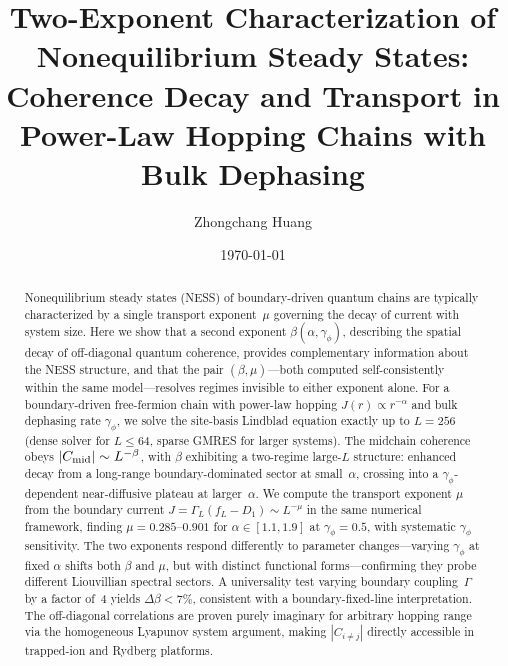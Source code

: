 \documentclass[aps,prb,twocolumn,superscriptaddress,floatfix]{revtex4-2}
\begin{document}
\title{Two-Exponent Characterization of Nonequilibrium Steady States: \\
Coherence Decay and Transport in Power-Law Hopping Chains with Bulk Dephasing}

\author{Zhongchang Huang}

\date{\today}

\begin{abstract}
Nonequilibrium steady states (NESS) of boundary-driven quantum chains are typically characterized by a single transport exponent~$\mu$ governing the decay of current with system size. Here we show that a second exponent $\beta(\alpha,\gamma_\phi)$, describing the spatial decay of off-diagonal quantum coherence, provides complementary information about the NESS structure, and that the pair $(\beta, \mu)$---both computed self-consistently within the same model---resolves regimes invisible to either exponent alone. For a boundary-driven free-fermion chain with power-law hopping $J(r) \propto r^{-\alpha}$ and bulk dephasing rate $\gamma_\phi$, we solve the site-basis Lindblad equation exactly up to $L=256$ (dense solver for $L\le 64$, sparse GMRES for larger systems). The midchain coherence obeys $|C_{\rm mid}| \sim L^{-\beta}$, with $\beta$ exhibiting a two-regime large-$L$ structure: enhanced decay from a long-range boundary-dominated sector at small~$\alpha$, crossing into a $\gamma_\phi$-dependent near-diffusive plateau at larger~$\alpha$. We compute the transport exponent $\mu$ from the boundary current $J = \Gamma_L(f_L-D_1) \sim L^{-\mu}$ in the same numerical framework, finding $\mu = 0.285$--$0.901$ for $\alpha \in [1.1, 1.9]$ at $\gamma_\phi = 0.5$, with systematic $\gamma_\phi$ sensitivity. The two exponents respond differently to parameter changes---varying $\gamma_\phi$ at fixed $\alpha$ shifts both $\beta$ and $\mu$, but with distinct functional forms---confirming they probe different Liouvillian spectral sectors. A universality test varying boundary coupling~$\Gamma$ by a factor of~4 yields $\Delta\beta < 7\%$, consistent with a boundary-fixed-line interpretation. The off-diagonal correlations are proven purely imaginary for arbitrary hopping range via the homogeneous Lyapunov system argument, making $|C_{i\neq j}|$ directly accessible in trapped-ion and Rydberg platforms.
\end{abstract}

\maketitle
\end{document}
